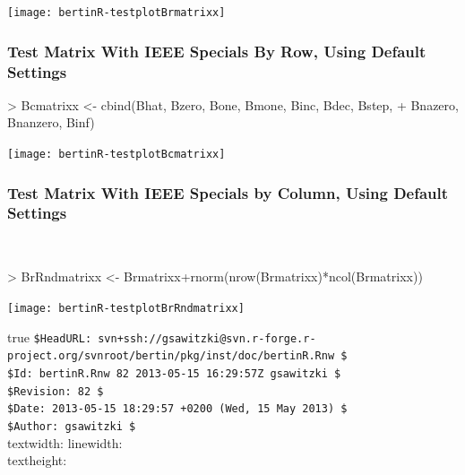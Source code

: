 \documentclass[nogin, dvips,12pt,a4paper,twoside]{amsart}
\def\private{true}%
\begin{document}
\texttt{[image: bertinR-testplotBrmatrixx]}

\clearpage

\subsubsection{Test Matrix With IEEE Specials By Row,  Using Default Settings}

\begin{Schunk}
\begin{Sinput}
> Bcmatrixx <- cbind(Bhat, Bzero, Bone, Bmone, Binc, Bdec, Bstep,
+ 	Bnazero, Bnanzero, Binf)
\end{Sinput}
\end{Schunk}

\texttt{[image: bertinR-testplotBcmatrixx]}

\clearpage

\subsubsection{Test Matrix With IEEE Specials by Column, Using Default Settings}\ 

\begin{Schunk}
\begin{Sinput}
> BrRndmatrixx <- Brmatrixx+rnorm(nrow(Brmatrixx)*ncol(Brmatrixx))
\end{Sinput}
\end{Schunk}
\texttt{[image: bertinR-testplotBrRndmatrixx]}


\vfill

\pagebreak

%


\printindex


\ifx\private\undefined%
\else
{}
\noindent
{\tiny%
\verb#$HeadURL: svn+ssh://gsawitzki@svn.r-forge.r-project.org/svnroot/bertin/pkg/inst/doc/bertinR.Rnw $#\\
\verb#$Id: bertinR.Rnw 82 2013-05-15 16:29:57Z gsawitzki $#\\
\verb#$Revision: 82 $#\\
\verb#$Date: 2013-05-15 18:29:57 +0200 (Wed, 15 May 2013) $#\\
\verb#$Author: gsawitzki $#\\
\currentpage textwidth: \prntlen{\textwidth} \qquad linewidth:\prntlen{\linewidth}\\
 textheight: \prntlen{\textheight}\\
}
\fi
\end{document}
